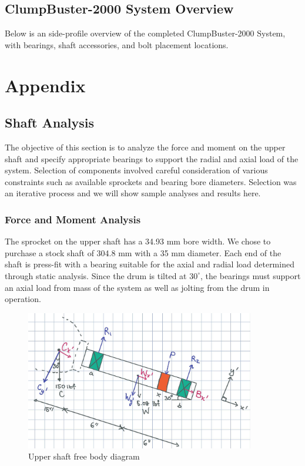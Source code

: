 \documentclass[letterpaper,12pt]{article}
\begin{document}
\subsection{ClumpBuster-2000 System Overview}
Below is an side-profile overview of the completed ClumpBuster-2000 System, with bearings, shaft accessories, and bolt placement locations. 

\newpage

\section{Appendix}
\subsection{Shaft Analysis}
The objective of this section is to analyze the force and moment on the upper shaft and specify appropriate bearings to support the radial and axial load of the system. Selection of components involved careful consideration of various constraints such as available sprockets and bearing bore diameters. Selection was an iterative process and we will show sample analyses and results here.

\subsubsection{Force and Moment Analysis}
The sprocket on the upper shaft has a 34.93 mm bore width. We chose to purchase a stock shaft of 304.8 mm with a 35 mm diameter. Each end of the shaft is press-fit with a bearing suitable for the axial and radial load determined through static analysis. Since the drum is tilted at $30^{\circ} $, the bearings must support an axial load from mass of the system as well as jolting from the drum in operation. 

\begin{figure}[h]
    \centering
    \includegraphics[width=10cm]{A3/MECH325A3FBD.jpg}
    \caption{Upper shaft free body diagram}
\end{figure}
    
\end{document}
